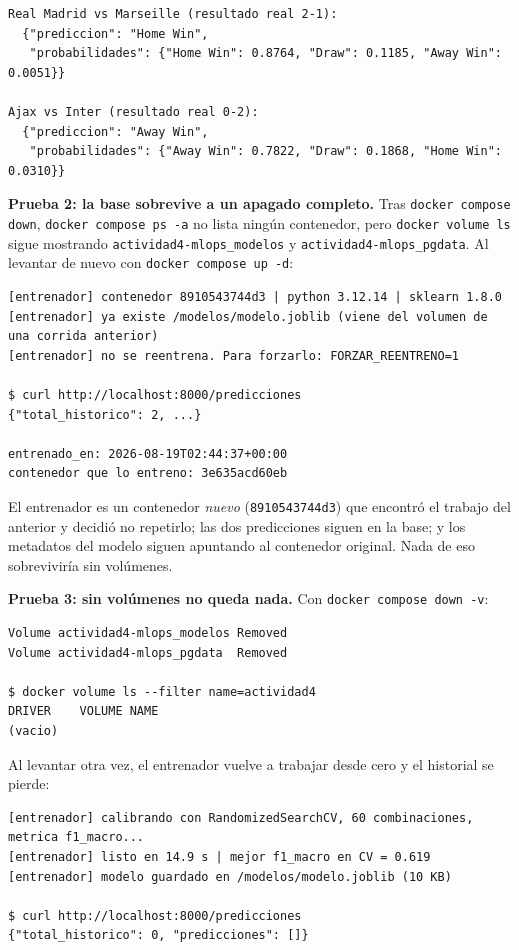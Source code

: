 \documentclass[12pt,a4paper]{article}
\begin{document}
\begin{verbatim}
Real Madrid vs Marseille (resultado real 2-1):
  {"prediccion": "Home Win",
   "probabilidades": {"Home Win": 0.8764, "Draw": 0.1185, "Away Win": 0.0051}}

Ajax vs Inter (resultado real 0-2):
  {"prediccion": "Away Win",
   "probabilidades": {"Away Win": 0.7822, "Draw": 0.1868, "Home Win": 0.0310}}
\end{verbatim}

\textbf{Prueba 2: la base sobrevive a un apagado completo.} Tras \texttt{docker compose down},
\texttt{docker compose ps -a} no lista ning\'un contenedor, pero \texttt{docker volume ls} sigue
mostrando \texttt{actividad4-mlops\_modelos} y \texttt{actividad4-mlops\_pgdata}. Al levantar de
nuevo con \texttt{docker compose up -d}:

\begin{verbatim}
[entrenador] contenedor 8910543744d3 | python 3.12.14 | sklearn 1.8.0
[entrenador] ya existe /modelos/modelo.joblib (viene del volumen de una corrida anterior)
[entrenador] no se reentrena. Para forzarlo: FORZAR_REENTRENO=1

$ curl http://localhost:8000/predicciones
{"total_historico": 2, ...}

entrenado_en: 2026-08-19T02:44:37+00:00
contenedor que lo entreno: 3e635acd60eb
\end{verbatim}

El entrenador es un contenedor \emph{nuevo} (\texttt{8910543744d3}) que encontr\'o el trabajo del
anterior y decidi\'o no repetirlo; las dos predicciones siguen en la base; y los metadatos del
modelo siguen apuntando al contenedor original. Nada de eso sobrevivir\'ia sin vol\'umenes.

\textbf{Prueba 3: sin vol\'umenes no queda nada.} Con \texttt{docker compose down -v}:

\begin{verbatim}
Volume actividad4-mlops_modelos Removed
Volume actividad4-mlops_pgdata  Removed

$ docker volume ls --filter name=actividad4
DRIVER    VOLUME NAME
(vacio)
\end{verbatim}

Al levantar otra vez, el entrenador vuelve a trabajar desde cero y el historial se pierde:

\begin{verbatim}
[entrenador] calibrando con RandomizedSearchCV, 60 combinaciones, metrica f1_macro...
[entrenador] listo en 14.9 s | mejor f1_macro en CV = 0.619
[entrenador] modelo guardado en /modelos/modelo.joblib (10 KB)

$ curl http://localhost:8000/predicciones
{"total_historico": 0, "predicciones": []}
\end{verbatim}
\end{document}
